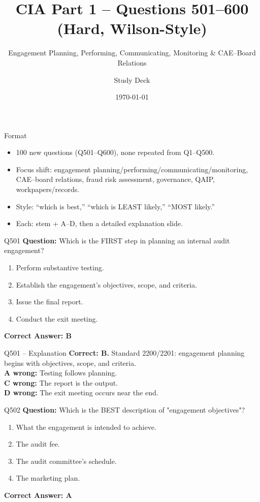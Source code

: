 \documentclass[aspectratio=169,10pt]{beamer}
\title{CIA Part 1 -- Questions 501--600 (Hard, Wilson-Style)}
\subtitle{Engagement Planning, Performing, Communicating, Monitoring \& CAE--Board Relations}
\author{Study Deck}
\date{\today}
\begin{document}
	
	\begin{frame}
		\titlepage
	\end{frame}
	
	\begin{frame}{Format}
		\begin{itemize}
			\item 100 new questions (Q501--Q600), none repeated from Q1--Q500.
			\item Focus shift: engagement planning/performing/communicating/monitoring, CAE--board relations, fraud risk assessment, governance, QAIP, workpapers/records.
			\item Style: ``which is best,'' ``which is LEAST likely,'' ``MOST likely.''
			\item Each: stem + A--D, then a detailed explanation slide.
		\end{itemize}
	\end{frame}
	
	\begin{frame}[t]{Q501}
		\small
		\textbf{Question:} Which is the FIRST step in planning an internal audit engagement?
		\begin{enumerate}[label=\Alph*.,itemsep=1pt,topsep=2pt]
			\item Perform substantive testing.
			\item Establish the engagement's objectives, scope, and criteria.
			\item Issue the final report.
			\item Conduct the exit meeting.
		\end{enumerate}
		\vspace{4pt}
		\textbf{Correct Answer: B}
	\end{frame}
	
	\begin{frame}[t]{Q501 -- Explanation}
		\small
		\textbf{Correct: B.} Standard 2200/2201: engagement planning begins with objectives, scope, and criteria. \\[4pt]
		\textbf{A wrong:} Testing follows planning. \\[2pt]
		\textbf{C wrong:} The report is the output. \\[2pt]
		\textbf{D wrong:} The exit meeting occurs near the end.
	\end{frame}
	
	\begin{frame}[t]{Q502}
		\small
		\textbf{Question:} Which is the BEST description of "engagement objectives"?
		\begin{enumerate}[label=\Alph*.,itemsep=1pt,topsep=2pt]
			\item What the engagement is intended to achieve.
			\item The audit fee.
			\item The audit committee's schedule.
			\item The marketing plan.
		\end{enumerate}
		\vspace{4pt}
		\textbf{Correct Answer: A}
	\end{frame}
	
\end{document}
